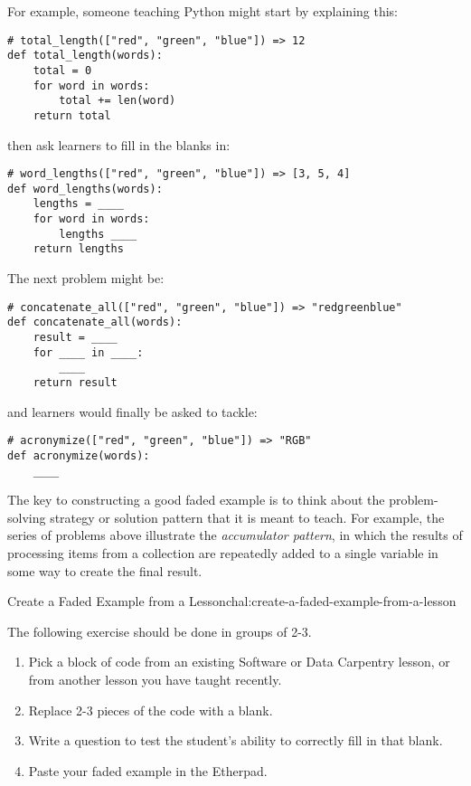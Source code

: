 For example, someone teaching Python might start by explaining this:

\begin{verbatim}
# total_length(["red", "green", "blue"]) => 12
def total_length(words):
    total = 0
    for word in words:
        total += len(word)
    return total
\end{verbatim}

then ask learners to fill in the blanks in:

\begin{verbatim}
# word_lengths(["red", "green", "blue"]) => [3, 5, 4]
def word_lengths(words):
    lengths = ____
    for word in words:
        lengths ____
    return lengths
\end{verbatim}

The next problem might be:

\begin{verbatim}
# concatenate_all(["red", "green", "blue"]) => "redgreenblue"
def concatenate_all(words):
    result = ____
    for ____ in ____:
        ____
    return result
\end{verbatim}

and learners would finally be asked to tackle:

\begin{verbatim}
# acronymize(["red", "green", "blue"]) => "RGB"
def acronymize(words):
    ____
\end{verbatim}

The key to constructing a good faded example is to think about the
problem-solving strategy or solution pattern that it is meant to teach.
For example, the series of problems above illustrate the
\emph{accumulator pattern}, in which the results of processing items
from a collection are repeatedly added to a single variable in some way
to create the final result.

\begin{challenge}{Create a Faded Example from a Lesson}{chal:create-a-faded-example-from-a-lesson}

The following exercise should be done in groups of 2-3.

\begin{enumerate}
\item
  Pick a block of code from an existing Software or Data Carpentry
  lesson, or from another lesson you have taught recently.
\item
  Replace 2-3 pieces of the code with a blank.
\item
  Write a question to test the student's ability to correctly fill in
  that blank.
\item
  Paste your faded example in the Etherpad.
\end{enumerate}
\end{challenge}

